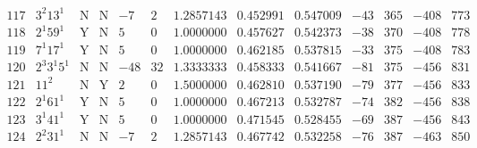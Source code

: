 \documentclass[11pt,reqno,a4letter]{article}
\numberwithin{equation}{section}
\numberwithin{figure}{section}
\numberwithin{table}{section}
\theoremstyle{plain}
\numberwithin{theorem}{section}
\theoremstyle{definition}
\begin{document}
\begin{table}[ht]
\begin{equation*}
{\begin{array}{cc|cc|ccc|cc|cccc}
 117 & 3^2 13^1 & \text{N} & \text{N} & -7 & 2 & 1.2857143 & 0.452991 & 0.547009 & -43 & 365 & -408 & 773 \\
 118 & 2^1 59^1 & \text{Y} & \text{N} & 5 & 0 & 1.0000000 & 0.457627 & 0.542373 & -38 & 370 & -408 & 778 \\
 119 & 7^1 17^1 & \text{Y} & \text{N} & 5 & 0 & 1.0000000 & 0.462185 & 0.537815 & -33 & 375 & -408 & 783 \\
 120 & 2^3 3^1 5^1 & \text{N} & \text{N} & -48 & 32 & 1.3333333 & 0.458333 & 0.541667 & -81 & 375 & -456 & 831 \\
 121 & 11^2 & \text{N} & \text{Y} & 2 & 0 & 1.5000000 & 0.462810 & 0.537190 & -79 & 377 & -456 & 833 \\
 122 & 2^1 61^1 & \text{Y} & \text{N} & 5 & 0 & 1.0000000 & 0.467213 & 0.532787 & -74 & 382 & -456 & 838 \\
 123 & 3^1 41^1 & \text{Y} & \text{N} & 5 & 0 & 1.0000000 & 0.471545 & 0.528455 & -69 & 387 & -456 & 843 \\
 124 & 2^2 31^1 & \text{N} & \text{N} & -7 & 2 & 1.2857143 & 0.467742 & 0.532258 & -76 & 387 & -463 & 850 \\
\end{array}
}
\end{equation*}
\clearpage 

\end{table} 
\end{document}
